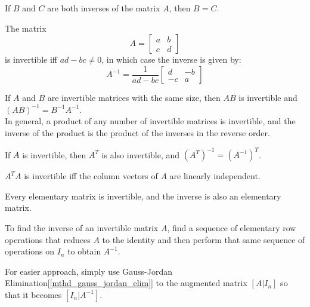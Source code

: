 \documentclass{report}
\begin{document}
		\begin{thm}
			If $B$ and $C$ are both inverses of the matrix $A$, then $B=C$.
		\end{thm}
		
		\begin{thm}\label{thm_inv_2_by_2}
			The matrix
			\begin{displaymath}
				A=
				\begin{bmatrix}
					a & b \\ c & d
				\end{bmatrix}
			\end{displaymath}
			is invertible iff $ad-bc\ne0$, in which case the inverse is given by:
			\begin{displaymath}
				A^{-1}=\frac{1}{ad-bc}
				\begin{bmatrix}
					d & -b \\ -c & a
				\end{bmatrix}
			\end{displaymath}
		\end{thm}
		
		\begin{thm}
			If $A$ and $B$ are invertible matrices with the same size, then $AB$ is invertible and $(AB)^{-1}=B^{-1}A^{-1}$.\\
			In general, a product of any number of invertible matrices is invertible, and the inverse of the product is the product of the inverses in the reverse order.
		\end{thm}
		
		\begin{thm}
			If $A$ is invertible, then $A^T$ is also invertible, and $(A^T)^{-1}=(A^{-1})^T$.
		\end{thm}
	
		\begin{thm}\label{thm_ata}
			$A^TA$ is invertible iff the column vectors of $A$ are linearly independent.
		\end{thm}
		
		\begin{thm}
			Every elementary matrix is invertible, and the inverse is also an elementary matrix.
		\end{thm}
		
		\begin{mthd}
			To find the inverse of an invertible matrix $A$, find a sequence of elementary row operations that reduces $A$ to the identity and then perform that same sequence of operations on $I_n$ to obtain $A^{-1}$.
			
			For easier approach, simply use Gauss-Jordan Elimination[\ref{mthd_gauss_jordan_elim}] to the augmented matrix $\left[A|I_n\right]$ so that it becomes $\left[I_n|A^{-1}\right]$.
		\end{mthd}
		
\end{document}
